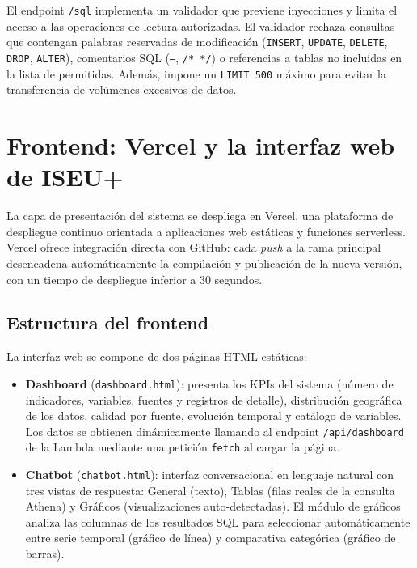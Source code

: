 El endpoint \texttt{/sql} implementa un validador que previene inyecciones y limita el acceso a las operaciones de lectura autorizadas. El validador rechaza consultas que contengan palabras reservadas de modificación (\texttt{INSERT}, \texttt{UPDATE}, \texttt{DELETE}, \texttt{DROP}, \texttt{ALTER}), comentarios SQL (\texttt{--}, \texttt{/* */}) o referencias a tablas no incluidas en la lista de permitidas. Además, impone un \texttt{LIMIT 500} máximo para evitar la transferencia de volúmenes excesivos de datos.

\section{Frontend: Vercel y la interfaz web de ISEU+}

La capa de presentación del sistema se despliega en Vercel, una plataforma de despliegue continuo orientada a aplicaciones web estáticas y funciones serverless. Vercel ofrece integración directa con GitHub: cada \textit{push} a la rama principal desencadena automáticamente la compilación y publicación de la nueva versión, con un tiempo de despliegue inferior a 30 segundos.

\subsection{Estructura del frontend}

La interfaz web se compone de dos páginas HTML estáticas:

\begin{itemize}
  \item \textbf{Dashboard} (\texttt{dashboard.html}): presenta los KPIs del sistema (número de indicadores, variables, fuentes y registros de detalle), distribución geográfica de los datos, calidad por fuente, evolución temporal y catálogo de variables. Los datos se obtienen dinámicamente llamando al endpoint \texttt{/api/dashboard} de la Lambda mediante una petición \texttt{fetch} al cargar la página.
  \item \textbf{Chatbot} (\texttt{chatbot.html}): interfaz conversacional en lenguaje natural con tres vistas de respuesta: General (texto), Tablas (filas reales de la consulta Athena) y Gráficos (visualizaciones auto-detectadas). El módulo de gráficos analiza las columnas de los resultados SQL para seleccionar automáticamente entre serie temporal (gráfico de línea) y comparativa categórica (gráfico de barras).
\end{itemize}

